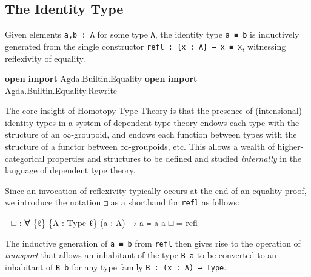 \documentclass[
  11pt,
  oneside,
  article]{memoir}
\newenvironment{Shaded}{}{}
\newcommand{\KeywordTok}[1]{\textcolor[rgb]{0.00,0.44,0.13}{\textbf{#1}}}
\newcommand{\NormalTok}[1]{#1}
\newcommand{\OtherTok}[1]{\textcolor[rgb]{0.00,0.44,0.13}{#1}}
\theoremstyle{definition}
\theoremstyle{plain}
\newcommand{\0}{\textsf{0}}
\newcommand{\1}{\tn{\textsf{1}}}
\begin{document}
\subsection{The Identity Type}\label{the-identity-type}

Given elements \texttt{a,b\ :\ A} for some type \texttt{A}, the identity
type \texttt{a\ ≡\ b} is inductively generated from the single
constructor \texttt{refl\ :\ \{x\ :\ A\}\ →\ x\ ≡\ x}, witnessing
reflexivity of equality.

\begin{Shaded}
\begin{Highlighting}[]
\KeywordTok{open} \KeywordTok{import}\NormalTok{ Agda}\OtherTok{.}\NormalTok{Builtin}\OtherTok{.}\NormalTok{Equality}
\KeywordTok{open} \KeywordTok{import}\NormalTok{ Agda}\OtherTok{.}\NormalTok{Builtin}\OtherTok{.}\NormalTok{Equality}\OtherTok{.}\NormalTok{Rewrite}
\end{Highlighting}
\end{Shaded}

The core insight of Homotopy Type Theory is that the presence of
(intensional) identity types in a system of dependent type theory endows
each type with the structure of an \(\infty\)-groupoid, and endows each
function between types with the structure of a functor between
\(\infty\)-groupoids, etc. This allows a wealth of higher-categorical
properties and structures to be defined and studied \emph{internally} in
the language of dependent type theory.

Since an invocation of reflexivity typically occurs at the end of an
equality proof, we introduce the notation \texttt{□} as a shorthand for
\texttt{refl} as follows:

\begin{Shaded}
\begin{Highlighting}[]
\OtherTok{\_}\NormalTok{□ }\OtherTok{:} \OtherTok{∀} \OtherTok{\{}\NormalTok{ℓ}\OtherTok{\}} \OtherTok{\{}\NormalTok{A }\OtherTok{:}\NormalTok{ Type ℓ}\OtherTok{\}} \OtherTok{(}\NormalTok{a }\OtherTok{:}\NormalTok{ A}\OtherTok{)} \OtherTok{→}\NormalTok{ a ≡ a}
\NormalTok{a □ }\OtherTok{=}\NormalTok{ refl}
\end{Highlighting}
\end{Shaded}

The inductive generation of \texttt{a\ ≡\ b} from \texttt{refl} then
gives rise to the operation of \emph{transport} that allows an
inhabitant of the type \texttt{B\ a} to be converted to an inhabitant of
\texttt{B\ b} for any type family \texttt{B\ :\ (x\ :\ A)\ →\ Type}.
\end{document}
